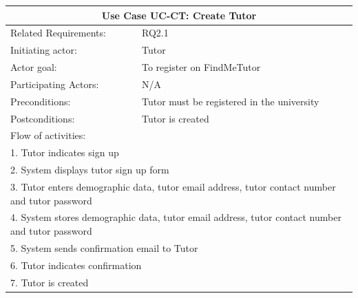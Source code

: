 \documentclass[12pt]{article}
\begin{document}
		\begin{tabular}{| l | l| }

			\hline\multicolumn{2}{|c|}{ \textbf{Use Case UC-CT: Create Tutor}} \\ \hline
			Related Requirements: & RQ2.1 \\ \hline
			Initiating actor: & Tutor \\ \hline
			Actor goal: & To register on FindMeTutor\\ \hline
			Participating Actors: & N/A\\ \hline
			Preconditions: &Tutor must be registered in the university\\ \hline
			Postconditions: & Tutor is created\\ \hline
			\multicolumn{2}{|l|}{Flow of activities:}\\ \hline
			\multicolumn{2}{|p{15cm}|}{1. Tutor indicates sign up}\\
			\multicolumn{2}{|p{15cm}|}{2. System displays tutor sign up form}\\
			\multicolumn{2}{|p{15cm}|}{3. Tutor enters demographic data, tutor email address, tutor contact number and tutor password}	\\
			\multicolumn{2}{|p{15cm}|}{4. System stores demographic data, tutor email address, tutor contact number and tutor password}\\
			\multicolumn{2}{|l|}{5. System sends confirmation email to Tutor}\\
			\multicolumn{2}{|l|}{6. Tutor indicates confirmation}	\\
			\multicolumn{2}{|l|}{7. Tutor is created}
			\\ \hline
		\end{tabular}
\end{document}

